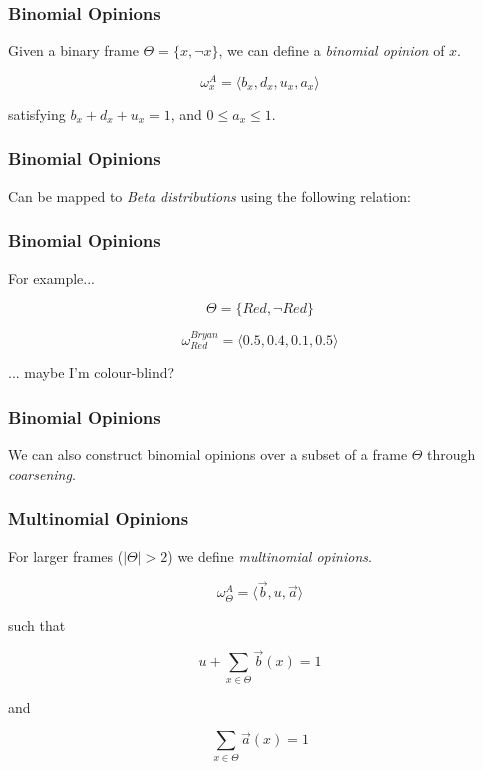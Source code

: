 \documentclass{beamer}
\begin{document}
\begin{frame}
\frametitle{Binomial Opinions}

Given a binary frame $\Theta = \lbrace x, \lnot x \rbrace$, we can define a
\emph{binomial opinion} of $x$.

$$\omega_{x}^A = \langle b_x, d_x, u_x, a_x \rangle$$

satisfying $b_x + d_x + u_x = 1$, and $0 \leq a_x \leq 1$.

\end{frame}


\begin{frame}
\frametitle{Binomial Opinions}

Can be mapped to \emph{Beta distributions} using the following relation:

\end{frame}


\begin{frame}
\frametitle{Binomial Opinions}

For example...

$$\Theta = \lbrace Red, \lnot Red \rbrace$$

$$\omega_{Red}^{Bryan} = \langle 0.5, 0.4, 0.1, 0.5 \rangle$$

... maybe I'm colour-blind?

\end{frame}


\begin{frame}
\frametitle{Binomial Opinions}

We can also construct binomial opinions over a subset of a frame $\Theta$
through \emph{coarsening}.


\end{frame}




\begin{frame}
\frametitle{Multinomial Opinions}

For larger frames ($|\Theta| > 2$) we define \emph{multinomial opinions}.

$$ \omega_\Theta^A = \langle \vec{b}, u, \vec{a} \rangle $$

such that

$$u + \sum_{x \in \Theta} \vec{b}(x) = 1$$

and

$$\sum_{x\in \Theta} \vec{a}(x) = 1$$

\end{frame}
\end{document}
